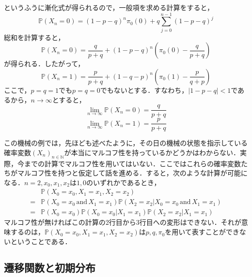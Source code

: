 \documentclass[12pt, a4paper]{jsarticle}
\theoremstyle{definition}
\newcommand{\NN}{{\mathbb{N}}} %
\begin{document}
というふうに漸化式が得られるので，一般項を求める計算をすると，
\begin{equation}
\mathbb{P}(X_n = 0) = (1-p-q)^n\pi_0(0) + q \sum_{j=0}^{n-1}(1-p-q)^j
\end{equation}
総和を計算すると，
\begin{equation}
	\mathbb{P}(X_n = 0) = \frac{q}{p+q} + (1- p- q)^{n} \left( \pi_0(0) - \frac{q}{p+ q} \right)
\end{equation}
が得られる．したがって，
\begin{equation}
	\mathbb{P}(X_n = 1) = \frac{p}{p+q} + (1- q- p)^{n} \left( \pi_0(1) - \frac{p}{q+ p} \right)
\end{equation}
ここで，$p=q=1$でも$p=q=0$でもないとする．すなわち，$|1-p-q| < 1$であるから，$n \to \infty$とすると，
\[\lim_{n \to \infty} \mathbb{P}(X_n = 0) = \frac{q}{p+q}\]
\[\lim_{n \to \infty} \mathbb{P}(X_n = 1) = \frac{p}{p+q}\]

この機械の例では，先ほども述べたように，その日の機械の状態を指示している確率変数$(X_n)_{n \in \NN}$が本当にマルコフ性を持っているかどうかはわからない．実際，今までの計算でマルコフ性を用いてはいない．ここではこれらの確率変数たちがマルコフ性を持つと仮定して話を進める．すると，次のような計算が可能になる．$n = 2,x_0,x_1,x_2$は$1,0$のいずれかであるとき，
\begin{align*}
	& \mathbb{P}(X_0 = x_0 , X_1 = x_1, X_2 = x_2) \\
	= &\mathbb{P}(X_0 = x_0\, \text{and}\, X_1 = x_1)\mathbb{P}(X_2 = x_2 | X_0 = x_0\, \text{and}\, X_1 = x_1 ) \\
	=&\mathbb{P}(X_0 = x_0)\mathbb{P}(X_0 = x_0| X_1 = x_1)\mathbb{P}(X_2 = x_2 | X_1 = x_1)
\end{align*}
マルコフ性が無ければこの計算の2行目から3行目への変形はできない．それが意味するのは，$\mathbb{P}(X_0 = x_0 , X_1 = x_1, X_2 = x_2)$は$p,q,\pi_0$を用いて表すことができないということである．

\subsection{遷移関数と初期分布}
\end{document}
